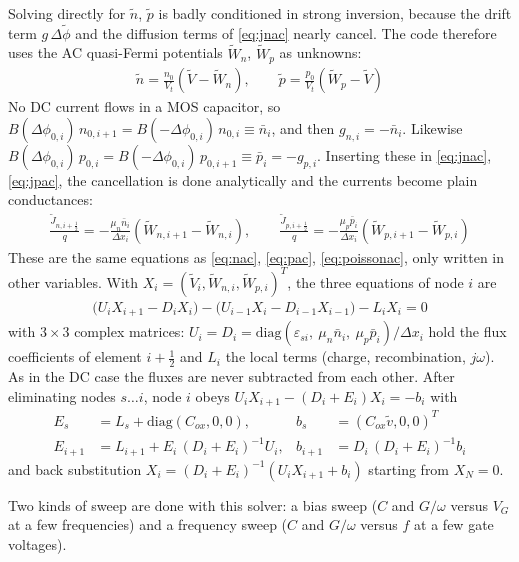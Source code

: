 \documentclass[11pt]{article}
\newcommand{\dphi}[1]{\Delta\phi_{#1}}
\newcommand{\half}{\tfrac{1}{2}}
\begin{document}
Solving directly for $\tilde n$, $\tilde p$ is badly conditioned in strong inversion, because the drift
term $g\,\Delta\tilde\phi$ and the diffusion terms of \eqref{eq:jnac} nearly cancel. The code therefore
uses the AC quasi-Fermi potentials $\tilde W_n$, $\tilde W_p$ as unknowns:
\begin{align}
\tilde n=\frac{n_0}{V_t}\left(\tilde V-\tilde W_n\right),\qquad
\tilde p=\frac{p_0}{V_t}\left(\tilde W_p-\tilde V\right)
\end{align}
No DC current flows in a MOS capacitor, so $B(\dphi{0,i})\,n_{0,i+1}=B(-\dphi{0,i})\,n_{0,i}\equiv\bar n_i$,
and then $g_{n,i}=-\bar n_i$. Likewise $B(\dphi{0,i})\,p_{0,i}=B(-\dphi{0,i})\,p_{0,i+1}\equiv\bar p_i=-g_{p,i}$.
Inserting these in \eqref{eq:jnac}, \eqref{eq:jpac}, the cancellation is done analytically and the currents
become plain conductances:
\begin{align}
\frac{\tilde J_{n,i+\half}}{q}=-\frac{\mu_n\bar n_i}{\Delta x_i}\left(\tilde W_{n,i+1}-\tilde W_{n,i}\right),\qquad
\frac{\tilde J_{p,i+\half}}{q}=-\frac{\mu_p\bar p_i}{\Delta x_i}\left(\tilde W_{p,i+1}-\tilde W_{p,i}\right)
\end{align}
These are the same equations as \eqref{eq:nac}, \eqref{eq:pac}, \eqref{eq:poissonac}, only written in other
variables. With $X_i=(\tilde V_i,\tilde W_{n,i},\tilde W_{p,i})^T$, the three equations of node $i$ are
\begin{align}
\big(U_iX_{i+1}-D_iX_i\big)-\big(U_{i-1}X_i-D_{i-1}X_{i-1}\big)-L_iX_i=0
\end{align}
with $3\times3$ complex matrices: $U_i=D_i=\mathrm{diag}\!\left(\varepsilon_{si},\ \mu_n\bar n_i,\ \mu_p\bar p_i\right)/\Delta x_i$
hold the flux coefficients of element $i+\half$ and $L_i$ the
local terms (charge, recombination, $j\omega$). As in the DC case the fluxes are never subtracted from each
other. After eliminating nodes $s\dots i$, node $i$ obeys $U_iX_{i+1}-(D_i+E_i)X_i=-b_i$ with
\begin{align}
E_s&=L_s+\mathrm{diag}(C_{ox},0,0), & b_s&=(C_{ox}\tilde v,0,0)^T\\
E_{i+1}&=L_{i+1}+E_i\,(D_i+E_i)^{-1}U_i, & b_{i+1}&=D_i\,(D_i+E_i)^{-1}b_i
\end{align}
and back substitution $X_i=(D_i+E_i)^{-1}\left(U_iX_{i+1}+b_i\right)$ starting from $X_N=0$.

Two kinds of sweep are done with this solver: a bias sweep ($C$ and $G/\omega$ versus $V_G$ at a few
frequencies) and a frequency sweep ($C$ and $G/\omega$ versus $f$ at a few gate voltages).
\end{document}

